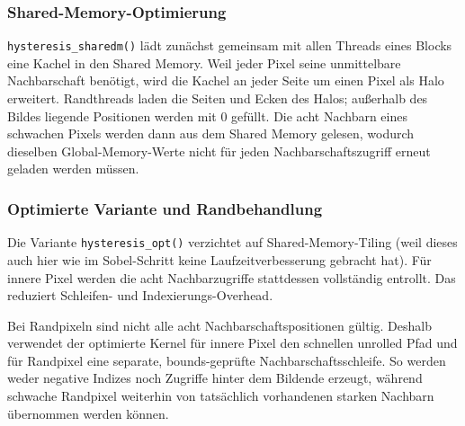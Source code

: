 \subsubsection{Shared-Memory-Optimierung}
\label{sec:shared_memory_hysteresis}

\texttt{hysteresis\_sharedm()} lädt zunächst gemeinsam mit allen Threads eines
Blocks eine Kachel in den Shared Memory. Weil jeder Pixel seine unmittelbare
Nachbarschaft benötigt, wird die Kachel an jeder Seite um einen Pixel als Halo
erweitert. Randthreads laden die Seiten und Ecken des Halos; außerhalb des
Bildes liegende Positionen werden mit 0 gefüllt. Die acht Nachbarn eines
schwachen Pixels werden dann aus dem Shared Memory gelesen, wodurch dieselben
Global-Memory-Werte nicht für jeden Nachbarschaftszugriff erneut geladen werden
müssen.

\subsubsection{Optimierte Variante und Randbehandlung}

Die Variante \texttt{hysteresis\_opt()} verzichtet auf Shared-Memory-Tiling (weil dieses auch hier wie im Sobel-Schritt keine Laufzeitverbesserung gebracht hat).
Für innere Pixel werden die acht Nachbarzugriffe stattdessen vollständig
entrollt. Das reduziert Schleifen- und Indexierungs-Overhead.

Bei Randpixeln sind nicht alle acht Nachbarschaftspositionen gültig. Deshalb
verwendet der optimierte Kernel für innere Pixel den schnellen unrolled Pfad
und für Randpixel eine separate, bounds-geprüfte Nachbarschaftsschleife. So
werden weder negative Indizes noch Zugriffe hinter dem Bildende erzeugt,
während schwache Randpixel weiterhin von tatsächlich vorhandenen starken
Nachbarn übernommen werden können.
